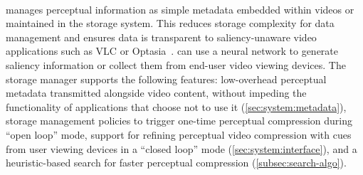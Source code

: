 \paragraph{\nameStore} manages perceptual information as simple metadata embedded within videos or maintained in the storage system.
This reduces storage complexity for data management and ensures \name data is transparent to saliency-unaware video applications such as VLC or Optasia~\cite{optasia2016lu}.
\nameStore can use a neural network to generate saliency information or collect them from end-user video viewing devices.
The storage manager supports the following features: low-overhead perceptual metadata transmitted alongside video content, without impeding the functionality of applications that choose not to use it (\ref{sec:system:metadata}), storage management policies to trigger one-time perceptual compression during ``open loop'' mode, support for refining perceptual video compression with cues from user viewing devices in a ``closed loop'' mode (\ref{sec:system:interface}), and a heuristic-based search for faster perceptual compression (\ref{subsec:search-algo}).
